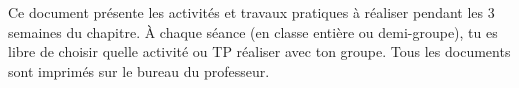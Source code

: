 \tetePremStssStru

\vspace*{-8pt}

  Ce document présente les activités et travaux pratiques à réaliser pendant les 3 semaines du chapitre.
  À chaque séance (en classe entière ou demi-groupe), tu es libre de choisir quelle activité ou TP réaliser avec ton groupe.
  Tous les documents sont imprimés sur le bureau du professeur.


\vspace*{-16pt}

\setcounter{activiteNum}{4}

